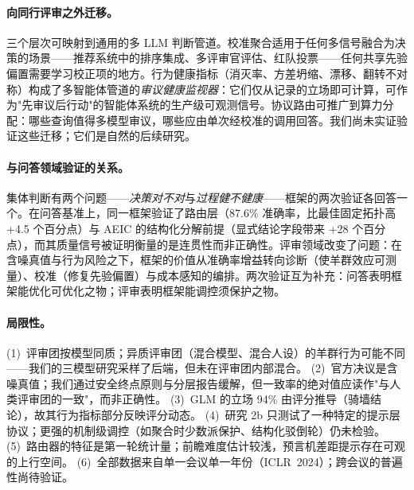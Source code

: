 \paragraph{向同行评审之外迁移。}
三个层次可映射到通用的多 LLM 判断管道。校准聚合适用于任何多信号融合为决策的场景——推荐系统中的排序集成、多评审官评估、红队投票——任何共享先验偏置需要学习校正项的地方。行为健康指标（消灭率、方差坍缩、漂移、翻转不对称）构成了多智能体管道的\emph{审议健康监视器}：它们仅从记录的立场即可计算，可作为"先审议后行动"的智能体系统的生产级可观测信号。协议路由可推广到算力分配：哪些查询值得多模型审议，哪些应由单次经校准的调用回答。我们尚未实证验证这些迁移；它们是自然的后续研究。

\paragraph{与问答领域验证的关系。}
集体判断有两个问题——\emph{决策对不对}与\emph{过程健不健康}——框架的两次验证各回答一个。在问答基准上，同一框架验证了路由层（87.6\% 准确率，比最佳固定拓扑高 +4.5 个百分点）与 AEIC 的结构化分解前提（显式结论字段带来 +28 个百分点），而其质量信号被证明衡量的是连贯性而非正确性。评审领域改变了问题：在含噪真值与行为风险之下，框架的价值从准确率增益转向诊断（使羊群效应可测量）、校准（修复先验偏置）与成本感知的编排。两次验证互为补充：问答表明框架能优化可优化之物；评审表明框架能调控须保护之物。

\paragraph{局限性。}
(1)~评审团按模型同质；异质评审团（混合模型、混合人设）的羊群行为可能不同——我们的三模型研究采样了后端，但未在评审团内部混合。
(2)~官方决议是含噪真值；我们通过安全终点原则与分层报告缓解，但一致率的绝对值应读作"与人类评审团的一致"，而非正确性。
(3)~GLM 的立场 94\% 由评分推导（骑墙结论），故其行为指标部分反映评分动态。
(4)~研究 2b 只测试了一种特定的提示层协议；更强的机制级调控（如聚合时少数派保护、结构化驳倒轮）仍未检验。
(5)~路由器的特征是第一轮统计量；前瞻难度估计较浅，预言机差距提示存在可观的上行空间。
(6)~全部数据来自单一会议单一年份（ICLR~2024）；跨会议的普遍性尚待验证。
